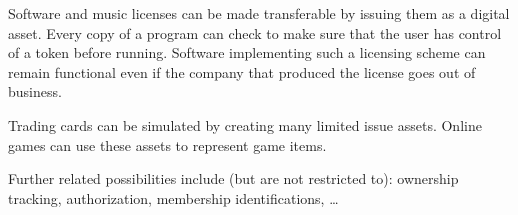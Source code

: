 Software and music licenses can be made transferable by issuing them as a
digital asset. Every copy of a program can check to make sure that the user
has control of a token before running. Software implementing such a licensing
scheme can remain functional even if the company that produced the license goes
out of business.

Trading cards can be simulated by creating many limited issue assets. Online
games can use these assets to represent game items.

Further related possibilities include (but are not restricted to): ownership
tracking, authorization, membership identifications, \ldots
